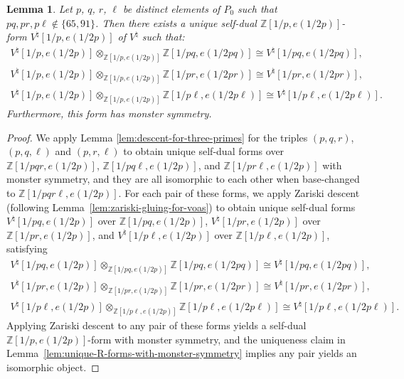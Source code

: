\documentclass[11pt]{article}
\newcommand{\bZ}{\mathbb{Z}}
\newtheorem{lem}[thm]{Lemma}
\theoremstyle{definition}
\begin{document}
\begin{lem} \label{lem:descent-for-tripod}Let $p$, $q$, $r$, $\ell$ be distinct elements of $P_0$ such that $pq, pr, p\ell \not\in \{65, 91\}$. Then there exists a unique self-dual $\bZ[1/p, e(1/2p)]$-form $V^\natural[1/p, e(1/2p)]$ of $V^\natural$ such that:{\samepage
\begin{gather*}
V^\natural[1/p, e(1/2p)] \otimes_{\bZ[1/p, e(1/2p)]} \bZ[1/pq, e(1/2pq)]\cong V^\natural[1/pq, e(1/2pq)], \\
V^\natural[1/p, e(1/2p)] \otimes_{\bZ[1/p, e(1/2p)]} \bZ[1/pr, e(1/2pr)]\cong V^\natural[1/pr, e(1/2pr)], \\
V^\natural[1/p, e(1/2p)] \otimes_{\bZ[1/p, e(1/2p)]} \bZ[1/p\ell, e(1/2p\ell)]\cong V^\natural[1/p\ell, e(1/2p\ell)].
\end{gather*}
Furthermore, this form has monster symmetry.}
\end{lem}
\begin{proof}We apply Lemma \ref{lem:descent-for-three-primes} for the triples $(p,q,r)$, $(p,q,\ell)$ and $(p,r,\ell)$ to obtain unique self-dual forms over $\bZ[1/pqr, e(1/2p)]$, $\bZ[1/pq\ell, e(1/2p)]$, and $\bZ[1/pr\ell, e(1/2p)]$ with monster symmetry, and they are all isomorphic to each other when base-changed to $\bZ[1/pqr\ell, e(1/2p)]$. For each pair of these forms, we apply Zariski descent (following Lemma~\ref{lem:zariski-gluing-for-voas}) to obtain unique self-dual forms $V^\natural[1/pq, e(1/2p)]$ over $\bZ[1/pq, e(1/2p)]$, $V^\natural[1/pr, e(1/2p)]$ over $\bZ[1/pr, e(1/2p)]$, and $V^\natural[1/p\ell, e(1/2p)]$ over $\bZ[1/p\ell, e(1/2p)]$, satisfying
\begin{gather*}
V^\natural[1/pq, e(1/2p)] \otimes_{\bZ[1/pq, e(1/2p)]} \bZ[1/pq, e(1/2pq)] \cong V^\natural[1/pq, e(1/2pq)], \\
V^\natural[1/pr, e(1/2p)] \otimes_{\bZ[1/pr, e(1/2p)]} \bZ[1/pr, e(1/2pr)]\cong V^\natural[1/pr, e(1/2pr)], \\
V^\natural[1/p\ell, e(1/2p)] \otimes_{\bZ[1/p\ell, e(1/2p)]} \bZ[1/p\ell, e(1/2p\ell)]\cong V^\natural[1/p\ell, e(1/2p\ell)].
\end{gather*}
Applying Zariski descent to any pair of these forms yields a self-dual $\bZ[1/p, e(1/2p)]$-form with monster symmetry, and the uniqueness claim in Lemma~\ref{lem:unique-R-forms-with-monster-symmetry} implies any pair yields an isomorphic object.
\end{proof}
\end{document}
